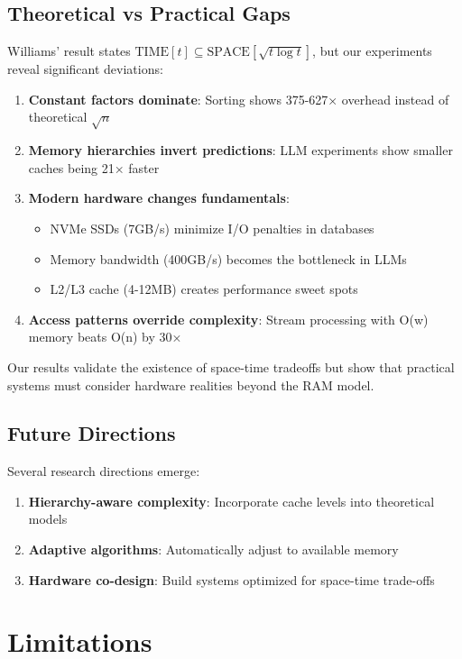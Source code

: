\documentclass[11pt]{article}
\theoremstyle{definition}
\begin{document}
\subsection{Theoretical vs Practical Gaps}

Williams' result states $\text{TIME}[t] \subseteq \text{SPACE}[\sqrt{t \log t}]$, but our experiments reveal significant deviations:

\begin{enumerate}
\item \textbf{Constant factors dominate}: Sorting shows 375-627× overhead instead of theoretical $\sqrt{n}$
\item \textbf{Memory hierarchies invert predictions}: LLM experiments show smaller caches being 21× faster
\item \textbf{Modern hardware changes fundamentals}: 
   \begin{itemize}
   \item NVMe SSDs (7GB/s) minimize I/O penalties in databases
   \item Memory bandwidth (400GB/s) becomes the bottleneck in LLMs
   \item L2/L3 cache (4-12MB) creates performance sweet spots
   \end{itemize}
\item \textbf{Access patterns override complexity}: Stream processing with O(w) memory beats O(n) by 30×
\end{enumerate}

Our results validate the existence of space-time tradeoffs but show that practical systems must consider hardware realities beyond the RAM model.

\subsection{Future Directions}

Several research directions emerge:

\begin{enumerate}
\item \textbf{Hierarchy-aware complexity}: Incorporate cache levels into theoretical models
\item \textbf{Adaptive algorithms}: Automatically adjust to available memory
\item \textbf{Hardware co-design}: Build systems optimized for space-time trade-offs
\end{enumerate}

\section{Limitations}
\end{document}
